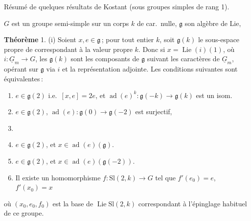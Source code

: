 \documentclass[11pt,a4paper]{article}
\begin{document}
Résumé de quelques résultats de Kostant (sous groupes simples de rang 1).

$G$ est un groupe semi-simple sur un corps $k$ de car.\ nulle,
$\mathfrak{g}$ son algèbre de Lie, 

\textbf{Théorème} 1. (i) Soient $x,e\in\mathfrak{g}$\,; pour tout entier $k$,
soit $\mathfrak{g}(k)$ le sous-espace propre de \ill{} correspondant à la
valeur propre $k$. Donc si $x=\operatorname{Lie}(i)(1)$, où
$i\colon\underline{G}_m\to G$, les $\mathfrak{g}(k)$ sont les composants de
$\mathfrak{g}$ suivant les caractères de $\underline{G}_m$, opérant sur
$\mathfrak{g}$ via $i$ et la représentation adjointe. Les conditions
suivantes sont équivalentes\,:

\begin{enumerate}
\item[a)] $e\in\mathfrak{g}(2)$ i.e.\ $[x,e]=2e$, et  $\operatorname{ad}(e)^{k}\colon\mathfrak{g}(-k)\to
\mathfrak{g}(k)$ est un isom.
\item[b)] $e\in\mathfrak{g}(2)$, $\operatorname{ad}(e)\colon\mathfrak{g}(0)
\to\mathfrak{g}(-2)$ est surjectif, 
\item[\struck{b')}] 
\item[c)] $e\in\mathfrak{g}(2)$, et $x\in\operatorname{ad}(e)(\mathfrak{g})$.
\item[c')] $e\in\mathfrak{g}(2)$, et $x\in\operatorname{ad}(e)(\mathfrak{g}(-2))$.
\item[d)] Il existe un homomorphisme $f\colon\mathrm{Sl}(2,k)\to G$ tel que
$f'(e_0)=e$, $f'(x_0)=x$
\end{enumerate}
où $(x_0,e_0,f_0)$ est la base de $\operatorname{Lie}\mathrm{Sl}(2,k)$
correspondant à l'épinglage habituel de ce groupe.
\end{document}
